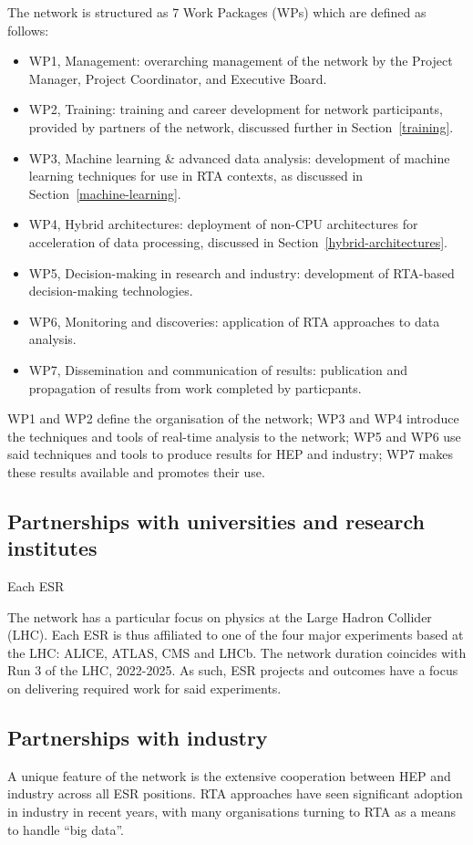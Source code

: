 The network is structured as 7 Work Packages (WPs) which are defined as follows:
\begin{itemize}
    \item WP1, Management: overarching management of the network by the Project Manager, Project Coordinator, and Executive Board.
    \item WP2, Training: training and career development for network participants, provided by partners of the network, discussed further in Section~\ref{training}.
    \item WP3, Machine learning \& advanced data analysis: development of machine learning techniques for use in RTA contexts, as discussed in Section~\ref{machine-learning}.
    \item WP4, Hybrid architectures: deployment of non-CPU architectures for acceleration of data processing, discussed in Section~\ref{hybrid-architectures}.
    \item WP5, Decision-making in research and industry: development of RTA-based decision-making technologies.
    \item WP6, Monitoring and discoveries: application of RTA approaches to data analysis. 
    \item WP7, Dissemination and communication of results: publication and propagation of results from work completed by particpants. 
\end{itemize}   
WP1 and WP2 define the organisation of the network; WP3 and WP4 introduce the techniques and tools of real-time analysis to the network; WP5 and WP6 use said techniques and tools to produce results for HEP and industry; WP7 makes these results available and promotes their use.


\subsection{Partnerships with universities and research institutes}
\label{sec-2}
Each ESR \par
The network has a particular focus on physics at the Large Hadron Collider (LHC). Each ESR is thus affiliated to one of the four major experiments based at the LHC: ALICE, ATLAS, CMS and LHCb. The network duration coincides with Run 3 of the LHC, 2022-2025. As such, ESR projects and outcomes have a focus on delivering required work for said experiments.

\subsection{Partnerships with industry}
\label{sec-2}
A unique feature of the network is the extensive cooperation between HEP and industry across all ESR positions. RTA approaches have seen significant adoption in industry in recent years, with many organisations turning to RTA as a means to handle ``big data''.